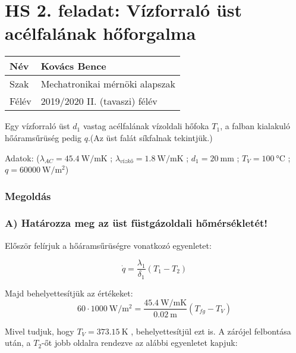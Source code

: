 
\section*{HS 2. feladat: Vízforraló üst acélfalának hőforgalma}

\begin{tabular}{ | p{2cm} | p{14cm} | } 
	\hline
	Név & Kovács Bence \\ 
	\hline
	Szak &  Mechatronikai mérnöki alapszak\\
	\hline
	Félév & 2019/2020 II. (tavaszi) félév \\ 
	\hline
\end{tabular}
\vspace{0.5cm}


Egy vízforraló üst $d_1$ vastag acélfalának vízoldali hőfoka $T_1$, a falban kialakuló hőáramsűrüség pedig $q$.(Az üst falát síkfalnak tekintjük.)

\noindent Adatok:    
($\lambda_{AC} = \SI{45.4}{\watt\per\meter\kelvin}$ ;
$\lambda_{\textit{vízkő}} = \SI{1,8}{\watt\per\meter\kelvin}$ ; 
$d_1 = \SI{20}{\milli\meter}$ ; 
$T_V = \SI{100}{\celsius} $ ; 
$q = \SI{60000}{\watt\per\meter\squared}$)

\vspace{3mm}

\hline
\subsubsection*{Megoldás}


\subsubsection*{A) Határozza meg az üst füstgázoldali hőmérsékletét!}


Először felírjuk a hőáramsűrüségre vonatkozó egyenletet:

\begin{equation}
	 \dot{q} = \frac{\lambda_1}{\delta_1} (T_1 - T_2)
\end{equation}


Majd behelyettesítjük az értékeket:
\begin{equation}
60 \cdot \SI{1000}{\watt\per\meter\squared} =  \frac{\SI{45.4}{\watt\per\meter\kelvin}}{\SI{0.02}{\meter}} (T_{fg} - T_V)
\end{equation}

Mivel tudjuk, hogy $T_V = \SI{373.15}{\kelvin}$ , behelyettesítjül ezt is.
A zárójel felbontása után, a $T_2$-őt jobb oldalra rendezve az alábbi egyenletet kapjuk:


